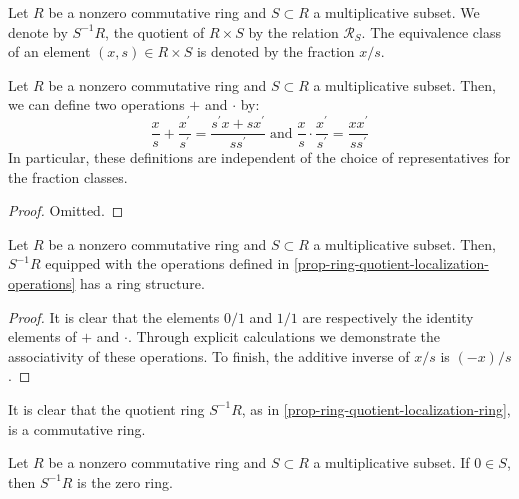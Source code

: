 \documentclass[12pt]{report}
\begin{document}
\begin{definition} \label{def-ring-quotient-localization}
    Let $R$ be a nonzero commutative ring and $S \subset R$ a multiplicative subset. We denote by $S^{-1} R$, the quotient of $R \times S$ by the relation $\mathcal{R}_S$. The equivalence class of an element $(x, s) \in R \times S$ is denoted by the fraction $x / s$.
\end{definition}

\begin{proposition} \label{prop-ring-quotient-localization-operations}
    Let $R$ be a nonzero commutative ring and $S \subset R$ a multiplicative subset. Then, we can define two operations $+$ and $\cdot$ by:
    \[
        \frac{x}{s} + \frac{x^{\prime}}{s^{\prime}} = \frac{s^{\prime} x + s x^{\prime}}{s s^{\prime}} \; \text{and} \; \frac{x}{s} \cdot \frac{x^{\prime}}{s^{\prime}} = \frac{x x^{\prime}}{s s^{\prime}}
    \]
    In particular, these definitions are independent of the choice of representatives for the fraction classes.
\end{proposition}

\begin{proof}
    Omitted.
\end{proof}

\begin{proposition} \label{prop-ring-quotient-localization-ring}
    Let $R$ be a nonzero commutative ring and $S \subset R$ a multiplicative subset. Then, $S^{-1} R$ equipped with the operations defined in \ref{prop-ring-quotient-localization-operations} has a ring structure.
\end{proposition}

\begin{proof}
    It is clear that the elements $0 / 1$ and $1 / 1$ are respectively the identity elements of $+$ and $\cdot$. Through explicit calculations we demonstrate the associativity of these operations. To finish, the additive inverse of $x / s$ is $ (-x) / s$.
\end{proof}

\begin{remark}
    It is clear that the quotient ring $S^{-1} R$, as in \ref{prop-ring-quotient-localization-ring}, is a commutative ring.
\end{remark}

\begin{proposition} \label{prop-ring-localization-zero}
    Let $R$ be a nonzero commutative ring and $S \subset R$ a multiplicative subset. If $0 \in S$, then $S^{-1} R$ is the zero ring.
\end{proposition}
\end{document}
